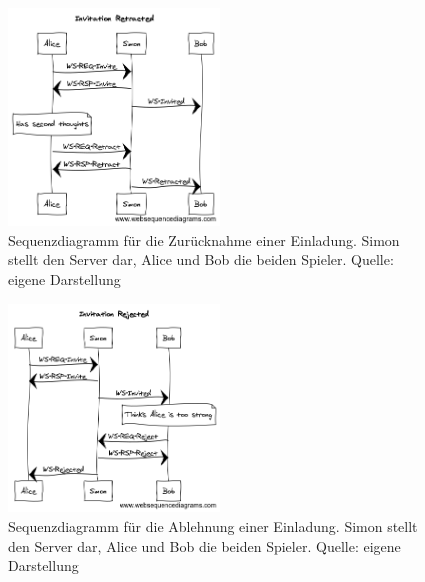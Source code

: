 \documentclass[ngerman,11pt]{report}
\begin{document}
\begin{figure}
\caption{Sequenzdiagramm für die Zurücknahme einer Einladung. Simon stellt den Server dar, Alice und Bob die beiden Spieler. Quelle: eigene Darstellung}
\centering
\includegraphics[width=0.5\textwidth]{InvitationRetracted}
\end{figure}

\begin{figure}
\caption{Sequenzdiagramm für die Ablehnung einer Einladung. Simon stellt den Server dar, Alice und Bob die beiden Spieler. Quelle: eigene Darstellung}
\centering
\includegraphics[width=0.5\textwidth]{InvitationRejected}
\end{figure}
\end{document}
